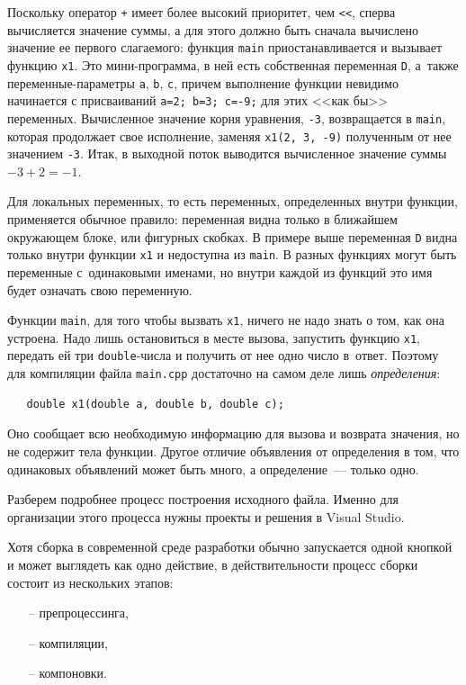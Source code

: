 \documentclass{article}
\begin{document}
Поскольку оператор \texttt{+} имеет более высокий приоритет, чем \texttt{<<}, сперва вычисляется значение суммы, а для этого должно быть сначала вычислено значение ее первого слагаемого: функция \texttt{main} приостанавливается и вызывает функцию \texttt{x1}. Это мини-программа, в ней есть собственная переменная \texttt{D}, а~также переменные-параметры \texttt{a}, \texttt{b}, \texttt{c}, причем выполнение функции невидимо начинается с присваиваний \texttt{a=2; b=3; c=-9;} для этих <<как бы>> переменных. Вычисленное значение корня уравнения, \texttt{-3}, возвращается в \texttt{main}, которая продолжает свое исполнение, заменяя \texttt{x1(2, 3, -9)} полученным от нее значением \texttt{-3}. Итак, в выходной поток выводится вычисленное значение суммы $-3 + 2 = -1$.

Для локальных переменных, то есть переменных, определенных внутри функции, применяется обычное правило: переменная видна только в ближайшем окружающем блоке, или фигурных скобках. В примере выше переменная \texttt{D} видна только внутри функции \texttt{x1} и недоступна из \texttt{main}. В разных функциях могут быть переменные с~одинаковыми именами, но внутри каждой из функций это имя будет означать свою переменную.

Функции \texttt{main}, для того чтобы вызвать \texttt{x1}, ничего не надо знать о том, как она устроена. Надо лишь остановиться в месте вызова, запустить функцию \texttt{x1}, передать ей три \texttt{double}-числа  и получить от нее одно число в~ответ. Поэтому для компиляции файла \texttt{main.cpp} достаточно на самом деле лишь \emph{определения}:
\begin{verbatim}
   double x1(double a, double b, double c);
\end{verbatim}
Оно сообщает всю необходимую информацию для вызова и возврата значения, но не содержит тела функции. Другое отличие объявления от определения в том, что одинаковых объявлений может быть много, а определение~--- только одно.

Разберем подробнее процесс построения исходного файла. Именно для организации этого процесса нужны проекты и решения в Visual Studio. 

Хотя сборка в современной среде разработки обычно запускается одной кнопкой и может выглядеть как одно действие, в действительности процесс сборки состоит из нескольких этапов:
\begin{itemize}[nolistsep]
    \item[--] 
    препроцессинга, 
    \item[--]
    компиляции, 
    \item[--]
    компоновки. 
\end{itemize}
\end{document}
